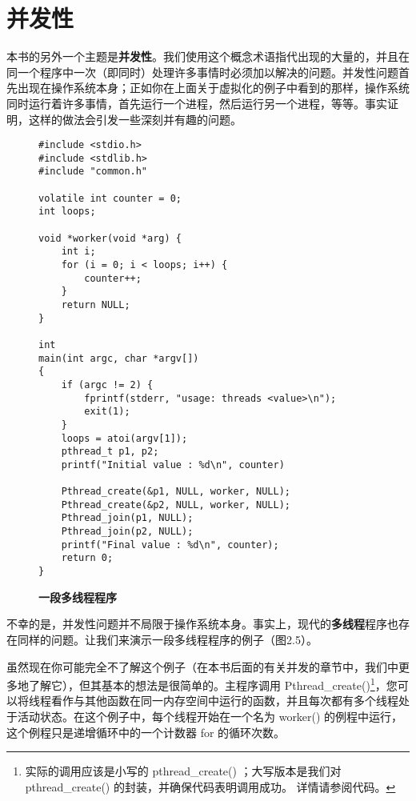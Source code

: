 \section{并发性}
本书的另外一个主题是\textbf{并发性}。我们使用这个概念术语指代出现的大量的，并且在同一个程序中一次（即同时）处理许多事情时必须加以解决的问题。并发性问题首先出现在操作系统本身；正如你在上面关于虚拟化的例子中看到的那样，操作系统同时运行着许多事情，首先运行一个进程，然后运行另一个进程，等等。事实证明，这样的做法会引发一些深刻并有趣的问题。

\begin{figure}[ht]
\begin{lstlisting}    
#include <stdio.h>
#include <stdlib.h>
#include "common.h"

volatile int counter = 0;
int loops;

void *worker(void *arg) {
    int i;
    for (i = 0; i < loops; i++) {
        counter++;
    }
    return NULL;
}

int
main(int argc, char *argv[])
{
    if (argc != 2) {
        fprintf(stderr, "usage: threads <value>\n");
        exit(1);
    }
    loops = atoi(argv[1]);
    pthread_t p1, p2;
    printf("Initial value : %d\n", counter)
    
    Pthread_create(&p1, NULL, worker, NULL);
    Pthread_create(&p2, NULL, worker, NULL);
    Pthread_join(p1, NULL);
    Pthread_join(p2, NULL);
    printf("Final value : %d\n", counter);
    return 0;
}

\end{lstlisting}
\caption{\textbf{一段多线程程序}}
\end{figure}

不幸的是，并发性问题并不局限于操作系统本身。事实上，现代的\textbf{多线程}程序也存在同样的问题。让我们来演示一段多线程程序的例子（图2.5）。

虽然现在你可能完全不了解这个例子（在本书后面的有关并发的章节中，我们中更多地了解它），但其基本的想法是很简单的。主程序调用 Pthread\_create()\footnote{实际的调用应该是小写的 pthread\_create() ；大写版本是我们对 pthread\_create() 的封装，并确保代码表明调用成功。 详情请参阅代码。}，您可以将线程看作与其他函数在同一内存空间中运行的函数，并且每次都有多个线程处于活动状态。在这个例子中，每个线程开始在一个名为 worker() 的例程中运行，这个例程只是递增循环中的一个计数器 for 的循环次数。

